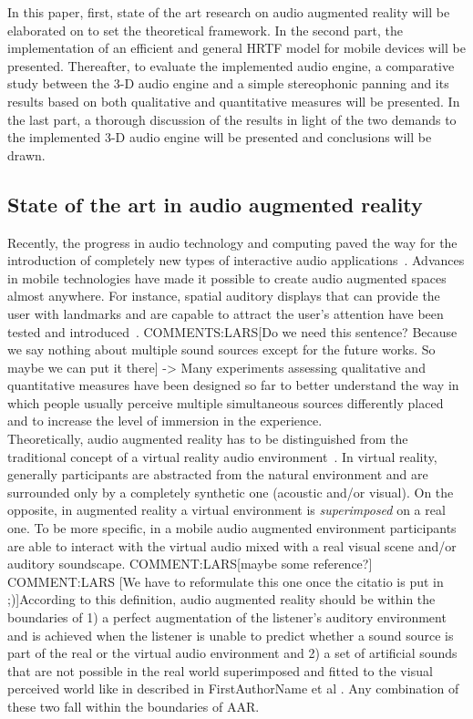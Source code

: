 \documentclass[journal]{IEEEtran}
\begin{document}
In this paper, first, state of the art research on audio augmented reality will be elaborated on to set the theoretical framework. In the second part, the implementation of an efficient and general HRTF model for mobile devices will be presented. Thereafter, to evaluate the implemented audio engine, a comparative study between the 3-D audio engine and a simple stereophonic panning and its results based on both qualitative and quantitative measures will be presented. In the last part, a thorough discussion of the results in light of the two demands to the implemented 3-D audio engine will be presented and conclusions will be drawn.

\subsection{State of the art in audio augmented reality}
Recently, the progress in audio technology and computing paved the way for the introduction of completely new types of interactive audio applications~\cite{}. Advances in mobile technologies have made it possible to create audio augmented spaces almost anywhere. For instance, spatial auditory displays that can provide the user with landmarks and are capable to attract the user's attention have been tested and introduced~\cite{}. COMMENTS:LARS[Do we need this sentence? Because we say nothing about multiple sound sources except for the future works. So maybe we can put it there] -> Many experiments assessing qualitative and quantitative measures have been designed so far to better understand the way in which people usually perceive multiple simultaneous sources differently placed and to increase the level of immersion in the experience.\\

Theoretically, audio augmented reality has to be distinguished from the traditional concept of a virtual reality audio environment~\cite{}. In virtual reality, generally participants are abstracted from the natural environment and are surrounded only by a completely synthetic one (acoustic and/or visual). On the opposite, in augmented reality a virtual environment is \emph{superimposed} on a real one. To be more specific, in a mobile audio augmented environment participants are able to interact with the virtual audio mixed with a real visual scene and/or auditory soundscape. COMMENT:LARS[maybe some reference?]\\

COMMENT:LARS [We have to reformulate this one once the citatio is put in ;)]According to this definition, audio augmented reality should be within the boundaries of 1) a perfect augmentation of the listener's auditory environment and is achieved when the listener is unable to predict whether a sound source is part of the real or the virtual audio environment and 2) a set of artificial sounds that are not possible in the real world superimposed and fitted to the visual perceived world like in described in FirstAuthorName et al \cite{}. Any combination of these two fall within the boundaries of AAR.\\
\end{document}
